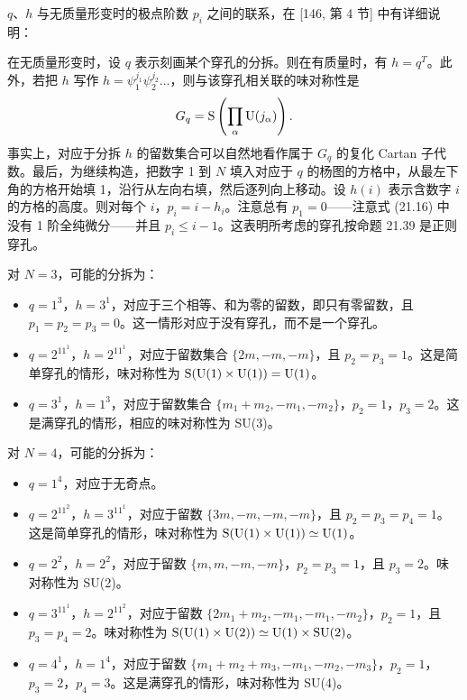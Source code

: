 $q$、$h$ 与无质量形变时的极点阶数 $p_i$ 之间的联系，在 [146, 第 4 节] 中有详细说明：

\begin{proposition}[21.41] 在无质量形变时，设 $q$ 表示刻画某个穿孔的分拆。则在有质量时，有 $h=q^T$。此外，若把 $h$ 写作 $h=\psi_1^{j_1}\psi_2^{j_2}\dots$，则与该穿孔相关联的味对称性是
\[
G_q=\mathrm{S}\left(\prod_\alpha \operatorname{U}(j_\alpha)\right).
\]
事实上，对应于分拆 $h$ 的留数集合可以自然地看作属于 $G_q$ 的复化 Cartan 子代数。最后，为继续构造，把数字 1 到 $N$ 填入对应于 $q$ 的杨图的方格中，从最左下角的方格开始填 1，沿行从左向右填，然后逐列向上移动。设 $h(i)$ 表示含数字 $i$ 的方格的高度。则对每个 $i$，$p_i=i-h_i$。注意总有 $p_1=0$——注意式 (21.16) 中没有 1 阶全纯微分——并且 $p_i\le i-1$。这表明所考虑的穿孔按命题 21.39 是正则穿孔。
\end{proposition}

\begin{example}[21.42] 对 $N=3$，可能的分拆为：
\begin{itemize}
\item $q=1^3$，$h=3^1$，对应于三个相等、和为零的留数，即只有零留数，且 $p_1=p_2=p_3=0$。这一情形对应于没有穿孔，而不是一个穿孔。
\item $q=2^11^1$，$h=2^11^1$，对应于留数集合 $\{2m,-m,-m\}$，且 $p_2=p_3=1$。这是简单穿孔的情形，味对称性为 $\mathrm{S}(\operatorname{U}(1)\times\operatorname{U}(1))=\operatorname{U}(1)$。
\item $q=3^1$，$h=1^3$，对应于留数集合 $\{m_1+m_2,-m_1,-m_2\}$，$p_2=1$，$p_3=2$。这是满穿孔的情形，相应的味对称性为 SU(3)。
\end{itemize}
\end{example}

\begin{example}[21.43] 对 $N=4$，可能的分拆为：
\begin{itemize}
\item $q=1^4$，对应于无奇点。
\item $q=2^11^2$，$h=3^11^1$，对应于留数 $\{3m,-m,-m,-m\}$，且 $p_2=p_3=p_4=1$。这是简单穿孔的情形，味对称性为 $\mathrm{S}(\operatorname{U}(1)\times\operatorname{U}(1))\simeq\operatorname{U}(1)$。
\item $q=2^2$，$h=2^2$，对应于留数 $\{m,m,-m,-m\}$，$p_2=p_3=1$，且 $p_3=2$。味对称性为 SU(2)。
\item $q=3^11^1$，$h=2^11^2$，对应于留数 $\{2m_1+m_2,-m_1,-m_1,-m_2\}$，$p_2=1$，且 $p_3=p_4=2$。味对称性为 $\mathrm{S}(\operatorname{U}(1)\times\operatorname{U}(2))\simeq\operatorname{U}(1)\times\operatorname{SU}(2)$。
\item $q=4^1$，$h=1^4$，对应于留数 $\{m_1+m_2+m_3,-m_1,-m_2,-m_3\}$，$p_2=1$，$p_3=2$，$p_4=3$。这是满穿孔的情形，味对称性为 SU(4)。
\end{itemize}
\end{example}

